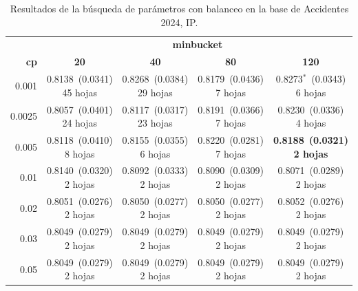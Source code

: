 \documentclass[twoside,a4paper,12pt,onecolumn,openany]{book}
\begin{document}
\begin{table}[H]
\centering
\small
\setlength{\tabcolsep}{4pt}
\begin{tabular}{r|cccc}
\toprule
 & \multicolumn{4}{c}{\textbf{minbucket}} \\
\cmidrule(lr){2-5}
\textbf{cp} & \textbf{20} & \textbf{40} & \textbf{80} & \textbf{120} \\
\midrule
0.001 & \shortstack{0.8138~(0.0341)\\ 45 hojas} & \shortstack{0.8268~(0.0384)\\ 29 hojas} & \shortstack{0.8179~(0.0436)\\ 7 hojas} & \shortstack{0.8273$^{*}$~(0.0343)\\ 6 hojas} \\[4pt]
0.0025 & \shortstack{0.8057~(0.0401)\\ 24 hojas} & \shortstack{0.8117~(0.0317)\\ 23 hojas} & \shortstack{0.8191~(0.0366)\\ 7 hojas} & \shortstack{0.8230~(0.0336)\\ 4 hojas} \\[4pt]
0.005 & \shortstack{0.8118~(0.0410)\\ 8 hojas} & \shortstack{0.8155~(0.0355)\\ 6 hojas} & \shortstack{0.8220~(0.0281)\\ 7 hojas} & \shortstack{\textbf{0.8188}~\textbf{(0.0321)}\\ \textbf{2 hojas}} \\[4pt]
0.01 & \shortstack{0.8140~(0.0320)\\ 2 hojas} & \shortstack{0.8092~(0.0333)\\ 2 hojas} & \shortstack{0.8090~(0.0309)\\ 2 hojas} & \shortstack{0.8071~(0.0289)\\ 2 hojas} \\[4pt]
0.02 & \shortstack{0.8051~(0.0276)\\ 2 hojas} & \shortstack{0.8050~(0.0277)\\ 2 hojas} & \shortstack{0.8050~(0.0277)\\ 2 hojas} & \shortstack{0.8052~(0.0276)\\ 2 hojas} \\[4pt]
0.03 & \shortstack{0.8049~(0.0279)\\ 2 hojas} & \shortstack{0.8049~(0.0279)\\ 2 hojas} & \shortstack{0.8049~(0.0279)\\ 2 hojas} & \shortstack{0.8049~(0.0279)\\ 2 hojas} \\[4pt]
0.05 & \shortstack{0.8049~(0.0279)\\ 2 hojas} & \shortstack{0.8049~(0.0279)\\ 2 hojas} & \shortstack{0.8049~(0.0279)\\ 2 hojas} & \shortstack{0.8049~(0.0279)\\ 2 hojas} \\[4pt]
\bottomrule
\end{tabular}
\caption{Resultados de la búsqueda de parámetros con balanceo en la base de Accidentes 2024, IP.}
\label{tab:busqueda_acc_ip_2024}
\end{table}
 
\end{document}
